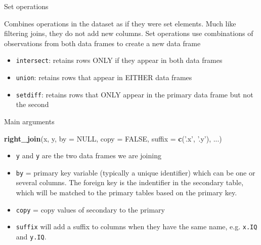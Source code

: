 \documentclass[ignorenonframetext,]{beamer}
\newenvironment{Shaded}{\begin{snugshade}}{\end{snugshade}}
\newcommand{\KeywordTok}[1]{\textcolor[rgb]{0.13,0.29,0.53}{\textbf{#1}}}
\newcommand{\DataTypeTok}[1]{\textcolor[rgb]{0.13,0.29,0.53}{#1}}
\newcommand{\StringTok}[1]{\textcolor[rgb]{0.31,0.60,0.02}{#1}}
\newcommand{\OtherTok}[1]{\textcolor[rgb]{0.56,0.35,0.01}{#1}}
\newcommand{\NormalTok}[1]{#1}
\providecommand{\tightlist}{%
  \setlength{\itemsep}{0pt}\setlength{\parskip}{0pt}}
\begin{document}
\begin{frame}[fragile]{Set operations}

\begin{block}{Combines operations in the dataset as if they were set
elements. Much like filtering joins, they do not add new columns. Set
operations use combinations of observations from both data frames to
create a new data frame}

\begin{itemize}
\tightlist
\item
  \texttt{intersect}: retains rows ONLY if they appear in both data
  frames
\item
  \texttt{union}: retains rows that appear in EITHER data frames
\item
  \texttt{setdiff}: retains rows that ONLY appear in the primary data
  frame but not the second
\end{itemize}

\end{block}

\end{frame}

\begin{frame}[fragile]{Main arguments}

\begin{Shaded}
\begin{Highlighting}[]
\KeywordTok{right_join}\NormalTok{(x, y, }\DataTypeTok{by =} \OtherTok{NULL}\NormalTok{, }\DataTypeTok{copy =} \OtherTok{FALSE}\NormalTok{, }\DataTypeTok{suffix =} \KeywordTok{c}\NormalTok{(}\StringTok{'.x'}\NormalTok{, }\StringTok{'.y'}\NormalTok{), ...)}
\end{Highlighting}
\end{Shaded}

\begin{itemize}
\tightlist
\item
  \texttt{y} and \texttt{y} are the two data frames we are joining
\item
  \texttt{by} = primary key variable (typically a unique identifier)
  which can be one or several columns. The foreign key is the
  indentifier in the secondary table, which will be matched to the
  primary tables based on the primary key.
\item
  \texttt{copy} = copy values of secondary to the primary
\item
  \texttt{suffix} will add a suffix to columns when they have the same
  name, e.g. \texttt{x.IQ} and \texttt{y.IQ}.
\end{itemize}

\end{frame}
\end{document}
